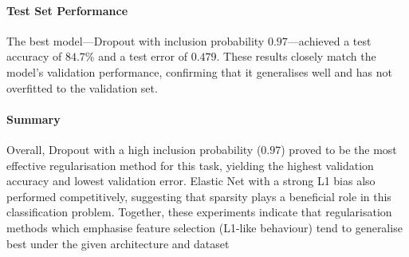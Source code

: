 {\paragraph{Test Set Performance}
The best model—Dropout with inclusion probability $0.97$—achieved a test accuracy of $84.7\%$ and a test error of $0.479$. 
These results closely match the model's validation performance, confirming that it generalises well and has not overfitted to the validation set.


\paragraph{Summary}
Overall, Dropout with a high inclusion probability ($0.97$) proved to be the most effective regularisation method for this task, 
yielding the highest validation accuracy and lowest validation error. Elastic Net with a strong L1 bias also performed competitively, 
suggesting that sparsity plays a beneficial role in this classification problem. Together, these experiments indicate that regularisation 
methods which emphasise feature selection (L1-like behaviour) tend to generalise best under the given architecture and dataset}

\newcommand{\questionNine} {
The results in Figure~\ref{fig:custom_activation} indicate that the model with the custom activation function struggles to learn effectively. The accuracy, and error curves behave very erratically. The training accuracy remains low, and the training error decreases, but not significantly,
over epochs, suggesting that the model is not fitting the training data well. This poor performance is likely due to vanishing gradients, as evidenced by the gradient flow plot, which shows that gradients diminish across layers during 
backpropagation. This issue prevents effective weight updates, leading to stagnation in learning. Consequently, the model does not exhibit overfitting; instead, it fails to learn from the training data altogether. It is also worth noting that the experiment was only run for 10 epochs, 
which may not be sufficient for convergence, but the gradient issues suggest deeper problems with the activation function choice}





